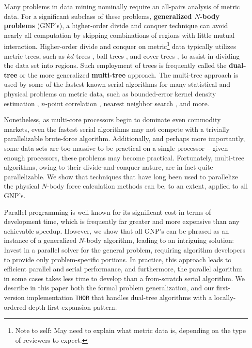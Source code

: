 \documentclass[twoside,leqno,twocolumn]{article}
\newcommand{\THOR}{{{\tt THOR}} }
\newcommand{\authornote}[1]{\footnote{Note to self: #1}}
\newcommand{\authorsnote}[1]{\authornote{#1}}
\newcommand{\defterm}[1]{{\bf #1}}
\begin{document}
Many problems in data mining nominally require an all-pairs analysis of metric data.
For a significant subclass of these problems, \defterm{generalized $N$-body problems} (GNP's), a higher-order divide and conquer technique can avoid nearly all computation by skipping combinations of regions with little mutual interaction.
Higher-order divide and conquer on metric\authorsnote{May need to explain what metric data is, depending on the type of reviewers to expect.} data typically utilizes metric trees, such as $kd$-trees \cite{preparata_kdtrees}, ball trees \cite{balltrees}, and cover trees \cite{covertrees}, to assist in dividing the data set into regions.
Such employment of trees is frequently called the \defterm{dual-tree} or the more generalized \defterm{multi-tree} approach.
The multi-tree approach is used by some of the fastest known serial algorithms for many statistical and physical problems on metric data, such as bounded-error kernel density estimation \cite{gray_kde, lee_gauss1, lee_gauss2}, $n$-point correlation \cite{gray_nbody}, nearest neighbor search \cite{ryan_nips}, and more.

Nonetheless, as multi-core processors begin to dominate even commodity markets, even the fastest serial algorithms may not compete with a trivially parallelizable brute-force algorithm.
Additionally, and perhaps more importantly, some data sets are too massive to be practical on a single processor -- given enough processors, these problems may become practical.
Fortunately, multi-tree algorithms, owing to their divide-and-conquer nature, are in fact quite parallelizable.
We show that techniques that have long been used to parallelize the physical $N$-body force calculation methods can be, to an extent, applied to all GNP's.

Parallel programming is well-known for its significant cost in terms of development time, which is frequently far greater and more expensive than any achievable speedup.
However, we show that all GNP's can be phrased as an instance of a generalized $N$-body algorithm, leading to an intriguing solution: Invest in a parallel solver for the general problem, requiring algorithm developers to provide only problem-specific portions.
In practice, this approach leads to efficient parallel and serial performance, and furthermore, the parallel algorithm in some cases takes less time to develop than a from-scratch serial algorithm.
We describe in this paper both the formal problem generalization, and our first-version implementation \THOR that handles dual-tree algorithms with a locally-ordered depth-first expansion pattern.
\end{document}
